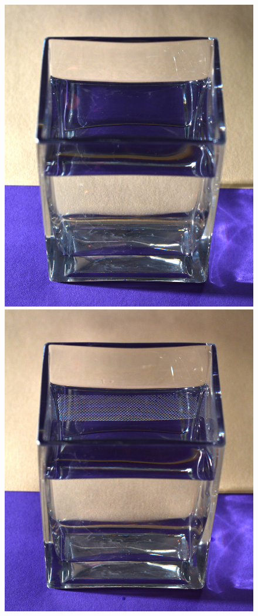 \begin{figure}[ht]
\centering
\includegraphics[width=5.5truecm]{slike/04_TIRF1.jpg}\qquad \qquad
\includegraphics[width=5.5truecm]{slike/04_TIRF2.jpg}

\end{figure}
